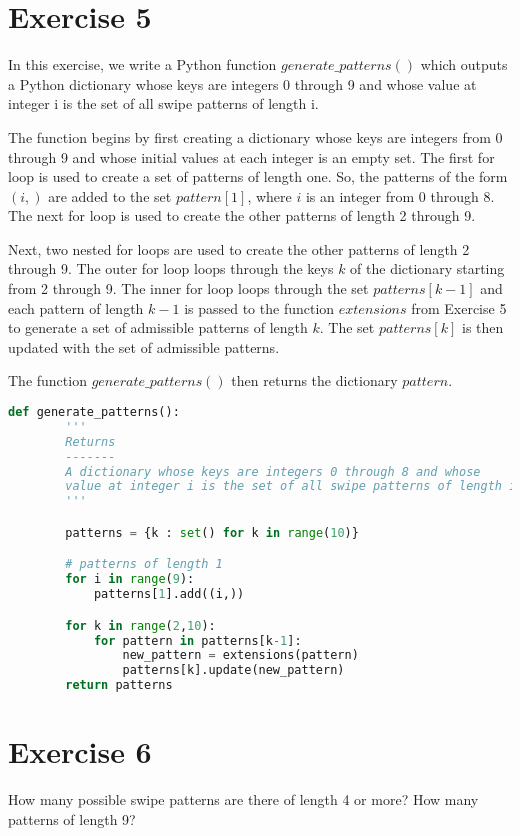 \documentclass[12pt]{article}
\theoremstyle{definition}
\begin{document}
\section*{Exercise 5}
In this exercise, we write a Python function $generate\_patterns()$ which outputs a Python dictionary whose keys are integers 0 through 9 and whose value at integer i is the set of all swipe patterns of length i.

The function begins by first creating a dictionary whose keys are integers from 0 through 9 and whose initial values at each integer is an empty set. 
The first for loop is used to create a set of patterns of length one. So, the patterns of the form $(i,)$ are added to the set $pattern[1]$, where $i$ is an integer from 0 through 8. The next for loop is used to create the other patterns of length 2 through 9.

Next, two nested for loops are used to create the other patterns of length 2 through 9.
The outer for loop loops through the keys $k$ of the dictionary starting from 2 through 9. The inner for loop loops through the set $patterns[k-1]$ and each pattern of length $k-1$ is passed to the function $extensions$ from Exercise 5 to generate a set of admissible patterns of length $k$. 
The set $patterns[k]$ is then updated with the set of admissible patterns.

The function $generate\_patterns()$ then returns the dictionary $pattern$.

\begin{lstlisting}[language=Python, caption=Sample Python Code]
    def generate_patterns():
        '''
        Returns
        -------
        A dictionary whose keys are integers 0 through 8 and whose 
        value at integer i is the set of all swipe patterns of length i
        '''

        patterns = {k : set() for k in range(10)}

        # patterns of length 1
        for i in range(9):
            patterns[1].add((i,))

        for k in range(2,10):
            for pattern in patterns[k-1]:
                new_pattern = extensions(pattern)
                patterns[k].update(new_pattern)
        return patterns

\end{lstlisting}

\section*{Exercise 6}
How many possible swipe patterns are there of length 4 or more? How many patterns of length 9?
\end{document}

